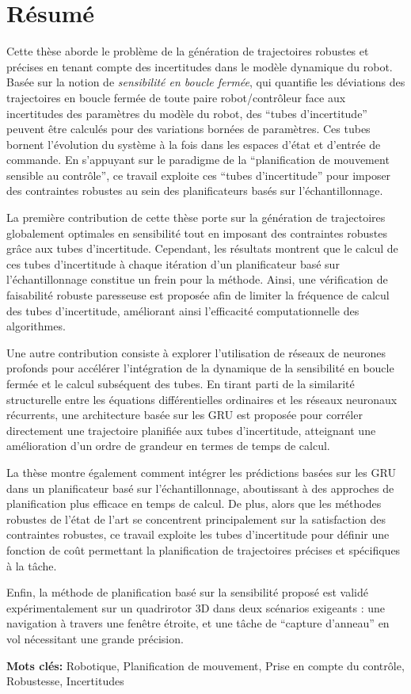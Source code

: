 \chapter*{Résumé}

Cette thèse aborde le problème de la génération de trajectoires robustes et précises en tenant compte des incertitudes dans le modèle dynamique du robot.
Basée sur la notion de \emph{sensibilité en boucle fermée}, qui quantifie les déviations des trajectoires en boucle fermée de toute paire robot/contrôleur face aux incertitudes des paramètres du modèle du robot, des ``tubes d'incertitude'' peuvent être calculés pour des variations bornées de paramètres. 
Ces tubes bornent l'évolution du système à la fois dans les espaces d'état et d'entrée de commande. 
En s'appuyant sur le paradigme de la ``planification de mouvement sensible au contrôle'', ce travail exploite ces ``tubes d'incertitude'' pour imposer des contraintes robustes au sein des planificateurs basés sur l'échantillonnage.

La première contribution de cette thèse porte sur la génération de trajectoires globalement optimales en sensibilité tout en imposant des contraintes robustes grâce aux tubes d'incertitude.
Cependant, les résultats montrent que le calcul de ces tubes d'incertitude à chaque itération d'un planificateur basé sur l'échantillonnage constitue un frein pour la méthode.
Ainsi, une vérification de faisabilité robuste paresseuse est proposée afin de limiter la fréquence de calcul des tubes d'incertitude, améliorant ainsi l'efficacité computationnelle des algorithmes.

Une autre contribution consiste à explorer l'utilisation de réseaux de neurones profonds pour accélérer l'intégration de la dynamique de la sensibilité en boucle fermée et le calcul subséquent des tubes.
En tirant parti de la similarité structurelle entre les équations différentielles ordinaires et les réseaux neuronaux récurrents, une architecture basée sur les GRU est proposée pour corréler directement une trajectoire planifiée aux tubes d'incertitude, atteignant une amélioration d'un ordre de grandeur en termes de temps de calcul.

La thèse montre également comment intégrer les prédictions basées sur les GRU dans un planificateur basé sur l'échantillonnage, aboutissant à des approches de planification plus efficace en temps de calcul.
De plus, alors que les méthodes robustes de l'état de l'art se concentrent principalement sur la satisfaction des contraintes robustes, ce travail exploite les tubes d'incertitude pour définir une fonction de coût permettant la planification de trajectoires précises et spécifiques à la tâche.

Enfin, la méthode de planification basé sur la sensibilité proposé est validé expérimentalement sur un quadrirotor 3D dans deux scénarios exigeants : une navigation à travers une fenêtre étroite, et une tâche de ``capture d'anneau'' en vol nécessitant une grande précision. 

\textbf{Mots clés:} Robotique, Planification de mouvement, Prise en compte du contrôle, Robustesse, Incertitudes